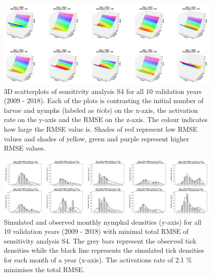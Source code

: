 \documentclass[a4paper, 11pt]{scrartcl}
\begin{document}
\begin{figure}
\centering
\includegraphics[width=\linewidth]{figures/independent_initial_ticks_without_beech_error.png}
\caption{3D scatterplots of sensitivity analysis S4 for all 10 validation years (2009 - 2018). Each of the plots is contrasting the initial number of larvae and nymphs
(labeled as \textit{ticks}) on the x-axis, the activation rate on the y-axis and the RMSE on the z-axis. The colour indicates how large the RMSE value is. Shades of red
represent low RMSE values and shades of yellow, green and purple represent higher RMSE values.}
\label{fig:independent_initial_ticks_without_beech_error_rotated}
\end{figure}

\begin{figure}
\centering
\includegraphics[width=\linewidth]{figures/independent_initial_ticks_without_beech.png}
\caption{Simulated and observed monthly nymphal densities (y-axis) for all 10 validation years (2009 - 2018) with minimal total RMSE of sensitivity analysis S4. The grey bars
represent the observed tick densities while the black line represents the simulated tick densities for each month of a year (x-axis). The activations rate of 2.1 \% minimises
the total RMSE.}
\label{fig:independent_initial_ticks_without_beech_rotated}
\end{figure}
\end{document}
